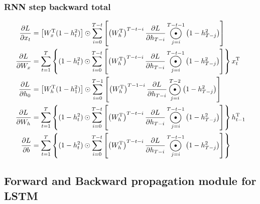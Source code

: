 \documentclass[12pt]{article}
\DeclareMathOperator*{\Odot}{\scalerel*{\odot}{\sum}}
\begin{document}
\setcounter{subsubsection}{3}
\subsubsection{RNN step backward total}
\begin{align*}
    \frac{\partial L}{\partial x_t}&=\left[W_x^\mathrm{T}(1-h_t^2)\right]\odot
        \sum_{i=0}^{T-t}\left[\left(W_h^\mathrm{T}\right)^{T-t-i}\frac{\partial L}{\partial h_{T-i}}\Odot_{j=i}^{T-t-1}\left(1-h_{T-j}^2 \right) \right]\\
    \frac{\partial L}{\partial W_x}&=\sum_{t=1}^{T}
        \left\{(1-h_t^2)\odot \sum_{i=0}^{T-t}
        \left[\left(W_h^\mathrm{T}\right)^{T-t-i}\frac{\partial L}{\partial h_{T-i}}
        \Odot_{j=i}^{T-t-1}\left(1-h_{T-j}^2 \right) \right]\right\}x_t^{\mathrm{T}}\\
    \frac{\partial L}{\partial h_0}&=\left[W_h^\mathrm{T}(1-h_1^2)\right]\odot
        \sum_{i=0}^{T-1}\left[\left(W_h^\mathrm{T}\right)^{T-1-i}\frac{\partial L}{\partial h_{T-i}}\Odot_{j=i}^{T-2}\left(1-h_{T-j}^2 \right) \right]\\
    \frac{\partial L}{\partial W_h}&=\sum_{t=1}^{T}
        \left\{(1-h_t^2)\odot \sum_{i=0}^{T-t}
        \left[\left(W_h^\mathrm{T}\right)^{T-t-i}\frac{\partial L}{\partial h_{T-i}}
        \Odot_{j=i}^{T-t-1}\left(1-h_{T-j}^2 \right) \right]\right\}h_{t-1}^{\mathrm{T}}\\
    \frac{\partial L}{\partial b}&=\sum_{t=1}^{T}
        \left\{(1-h_t^2)\odot \sum_{i=0}^{T-t}
        \left[\left(W_h^\mathrm{T}\right)^{T-t-i}\frac{\partial L}{\partial h_{T-i}}
        \Odot_{j=i}^{T-t-1}\left(1-h_{T-j}^2 \right) \right]\right\}
\end{align*}

\subsection{Forward and Backward propagation module for LSTM}



\newpage
\end{document}
